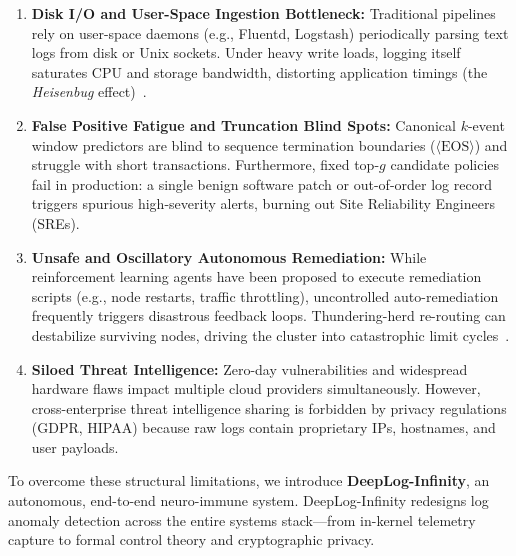 \documentclass[letterpaper,twocolumn,10pt]{article}
\begin{document}
\begin{enumerate}[leftmargin=*]
    \item \textbf{Disk I/O and User-Space Ingestion Bottleneck:} Traditional pipelines rely on user-space daemons (e.g., Fluentd, Logstash) periodically parsing text logs from disk or Unix sockets. Under heavy write loads, logging itself saturates CPU and storage bandwidth, distorting application timings (the \textit{Heisenbug} effect)~\cite{curtsinger2013coz}.
    \item \textbf{False Positive Fatigue and Truncation Blind Spots:} Canonical $k$-event window predictors are blind to sequence termination boundaries ($\langle\text{EOS}\rangle$) and struggle with short transactions. Furthermore, fixed top-$g$ candidate policies fail in production: a single benign software patch or out-of-order log record triggers spurious high-severity alerts, burning out Site Reliability Engineers (SREs).
    \item \textbf{Unsafe and Oscillatory Autonomous Remediation:} While reinforcement learning agents have been proposed to execute remediation scripts (e.g., node restarts, traffic throttling), uncontrolled auto-remediation frequently triggers disastrous feedback loops. Thundering-herd re-routing can destabilize surviving nodes, driving the cluster into catastrophic limit cycles~\cite{barham2003xen}.
    \item \textbf{Siloed Threat Intelligence:} Zero-day vulnerabilities and widespread hardware flaws impact multiple cloud providers simultaneously. However, cross-enterprise threat intelligence sharing is forbidden by privacy regulations (GDPR, HIPAA) because raw logs contain proprietary IPs, hostnames, and user payloads.
\end{enumerate}

To overcome these structural limitations, we introduce \textbf{DeepLog-Infinity}, an autonomous, end-to-end neuro-immune system. DeepLog-Infinity redesigns log anomaly detection across the entire systems stack---from in-kernel telemetry capture to formal control theory and cryptographic privacy.
\end{document}
